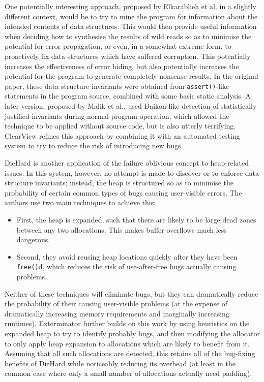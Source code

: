 One potentially interesting approach, proposed by Elkarablieh et
al.\cite{Elkarablieh2007} in a slightly different context, would be to
try to mine the program for information about the intended contents of
data structures.  This would then provide useful information when
deciding how to synthesise the results of wild reads so as to minimise
the potential for error propagation, or even, in a somewhat extreme
form, to proactively fix data structures which have suffered
corruption.  This potentially increases the effectiveness of error
hiding, but also potentially increases the potential for the program
to generate completely nonsense results.  In the original paper, these
data structure invariants were obtained from \verb|assert()|-like
statements in the program source, combined with some basic static
analysis.  A later version, proposed by Malik et al.\cite{Malik}, used
Daikon\cite{Ernst2007}-like detection of statistically justified
invariants during normal program operation, which allowed the
technique to be applied without source code, but is also utterly
terrifying.  ClearView\cite{Perkins} refines
this approach by combining it with an automated testing system to try
to reduce the risk of introducing new bugs.

DieHard\cite{Berger2006} is another application of the failure
oblivious concept to heap-related issues.  In this system, however, no
attempt is made to discover or to enforce data structure invariants;
instead, the heap is structured so as to minimise the probability of
certain common types of bugs causing user-visible errors.  The authors
use two main techniques to achieve this:

\begin{itemize}
\item First, the heap is expanded, such that there are likely to be
  large dead zones between any two allocations.  This makes buffer
  overflows much less dangerous.
\item Second, they avoid reusing heap locations quickly after they
  have been \verb|free()|d, which reduces the risk of use-after-free
  bugs actually causing problems.
\end{itemize}

Neither of these techniques will eliminate bugs, but they can
dramatically reduce the probability of their causing user-visible
problems (at the expense of dramatically increasing memory
requirements and marginally increasing runtimes).
Exterminator\cite{Novark2007} further builds on this work by using
heuristics on the expanded heap to try to identify probably bugs, and
then modifying the allocator to only apply heap expansion to
allocations which are likely to benefit from it.  Assuming that all
such allocations are detected, this retains all of the bug-fixing
benefits of DieHard while noticeably reducing its overhead (at least
in the common case where only a small number of allocations actually
need padding).

